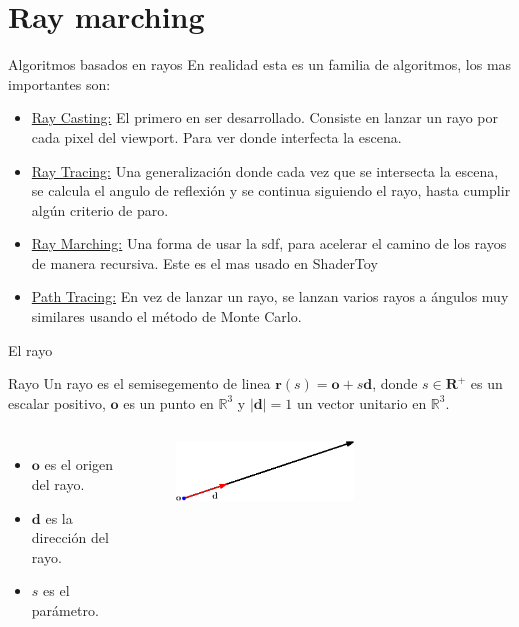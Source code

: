\section{Ray marching}
\begin{frame}{Algoritmos basados en rayos}
En realidad esta es un familia de algoritmos, los mas importantes son:

\begin{itemize}
    \item \href{https://en.wikipedia.org/wiki/Ray_casting}{Ray Casting:} El primero en ser desarrollado. Consiste en lanzar un rayo por cada pixel del viewport. Para ver donde interfecta la escena.
    \item \href{https://en.wikipedia.org/wiki/Ray_tracing_(graphics)}{Ray Tracing:} Una generalización donde cada vez que se intersecta la escena, se calcula el angulo de reflexión y se continua siguiendo el rayo, hasta cumplir algún criterio de paro.
    \item \href{https://en.wikipedia.org/wiki/Ray_marching}{Ray Marching:} Una forma de usar la sdf, para acelerar el camino de los rayos de manera recursiva. Este es el mas usado en ShaderToy
    \item \href{https://en.wikipedia.org/wiki/Path_tracing}{Path Tracing:} En vez de lanzar un rayo, se lanzan varios rayos a ángulos muy similares usando el método de Monte Carlo.
\end{itemize}

\end{frame}

\begin{frame}{El rayo}
\begin{block}{Rayo}
Un rayo es el semisegemento de linea $\mathbf{r}(s) = \mathbf{o} + s  \mathbf{d}$, donde $s \in \mathbf{R}^{+}$ es un escalar positivo, $\mathbf{o}$ es un punto en $\mathbb{R}^3$ y $|\mathbf{d}| = 1$ un vector unitario en $\mathbb{R}^3$. 

\end{block}

\begin{columns}
\begin{itemize}
    \item $\mathbf{o}$ es el origen del rayo.
    \item $\mathbf{d}$ es la dirección del rayo.
    \item $s$ es el parámetro.
\end{itemize}    
\begin{figure}[htp]
    \centering
    \includegraphics[width=0.6\textwidth]{img/ray.eps}    
\end{figure}
\end{columns}
\end{frame}

